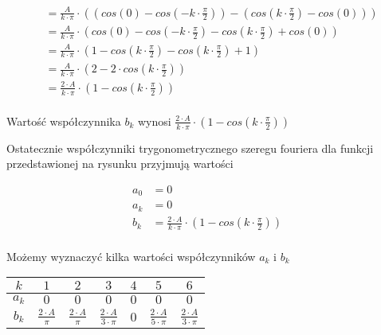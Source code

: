 \begin{equation}
\begin{aligned}
&=\frac{A}{k \cdot \pi} \cdot \left(\left( cos\left(0 \right) - cos\left(- k \cdot \frac{\pi}{2} \right) \right) - \left( cos\left( k \cdot \frac{\pi}{2} \right) - cos\left( 0 \right) \right) \right)\\
&=\frac{A}{k \cdot \pi} \cdot \left( cos\left(0 \right) - cos\left(- k \cdot \frac{\pi}{2} \right) - cos\left( k \cdot \frac{\pi}{2} \right) + cos\left( 0 \right) \right)\\
&=\frac{A}{k \cdot \pi} \cdot \left( 1 - cos\left( k \cdot \frac{\pi}{2} \right) - cos\left( k \cdot \frac{\pi}{2} \right) + 1 \right)\\
&=\frac{A}{k \cdot \pi} \cdot \left( 2 - 2 \cdot cos\left(k \cdot \frac{\pi}{2} \right) \right)\\
&=\frac{2 \cdot A}{k \cdot \pi} \cdot \left( 1 - cos\left(k \cdot \frac{\pi}{2} \right) \right)\\
\end{aligned}
\end{equation}

Wartość współczynnika $b_k$ wynosi $\frac{2 \cdot A}{k \cdot \pi} \cdot \left( 1 - cos\left(k \cdot \frac{\pi}{2} \right) \right)$


Ostatecznie współczynniki trygonometrycznego szeregu fouriera dla funkcji przedstawionej na rysunku przyjmują wartości

\begin{equation}
\begin{aligned}
a_0&=0\\
a_k&=0\\
b_k&=\frac{2 \cdot A}{k \cdot \pi} \cdot \left( 1 - cos\left(k \cdot \frac{\pi}{2} \right) \right)\\
\end{aligned}
\end{equation}

Możemy wyznaczyć kilka wartości współczynników $a_k$ i $b_k$

\begin{table}[H]
\centering  
\begin{tabular}{|c|c|c|c|c|c|c|}
  \hline 
  $k$ & $1$ & $2$ & $3$ & $4$ & $5$ & $6$\\ 
  \hline 
  $a_k$ & $0$ & $0$ & $0$ & $0$ & $0$ & $0$\\ 
  \hline 
  $b_k$ & $\frac{2\cdot A}{\pi}$ & $\frac{2\cdot A}{\pi}$ & $\frac{2\cdot A}{3 \cdot \pi}$ & $0$ & $\frac{2\cdot A}{5 \cdot \pi}$ & $\frac{2\cdot A}{3 \cdot \pi}$ \\ 
  \hline 
\end{tabular} 
\end{table}

